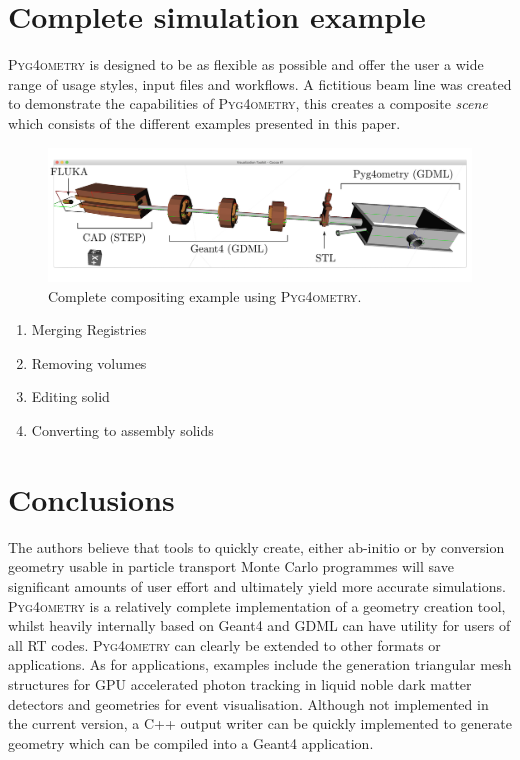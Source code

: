 \documentclass[final,5p,times,twocolumn]{elsarticle}
\newcommand{\PYGEOMETRY}{\textsc{Pyg4ometry}}
\begin{document}
\section{Complete simulation example}
\PYGEOMETRY{} is designed to be as flexible as possible and offer the user a wide range of usage styles, input files 
and workflows. A fictitious beam line was created to demonstrate the capabilities of \PYGEOMETRY, this creates a composite 
{\it scene} which consists of the different examples presented in this paper.
%
\begin{figure}
\begin{center}
\includegraphics[width=1.0\textwidth]{./model-scene/model.pdf}
\caption{Complete compositing example using \PYGEOMETRY{}.}
\label{fig:model}
\end{center}
\end{figure}

\begin{enumerate}
\item Merging Registries 
\item Removing volumes 
\item Editing solid
\item Converting to assembly solids 
\end{enumerate}
%


\section{Conclusions}
The authors believe that tools to quickly create, either ab-initio or by conversion geometry usable in 
particle transport Monte Carlo programmes will save significant amounts of user effort and ultimately 
yield more accurate simulations. \PYGEOMETRY{} is a relatively complete implementation of a geometry 
creation tool, whilst heavily internally based on Geant4 and GDML can have utility for users of all RT 
codes. \PYGEOMETRY{} can clearly be extended to other formats or applications. As for applications, examples 
include  the  generation triangular mesh structures for GPU accelerated photon tracking in liquid noble dark 
matter detectors and geometries for event visualisation. Although not implemented in the current version, 
a C++ output writer can be quickly implemented to generate geometry which can be compiled into a Geant4 
application. 
\end{document}
